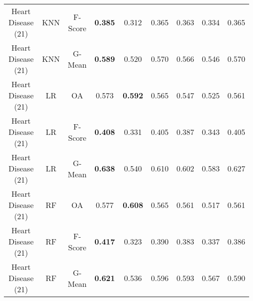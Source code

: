 \begin{longtable}{ccccccccc}
Heart Disease (21) &        KNN & F-Score & \textbf{0.385} &          0.312 &          0.365 &          0.363 &          0.334 &          0.365 \\
Heart Disease (21) &        KNN &  G-Mean & \textbf{0.589} &          0.520 &          0.570 &          0.566 &          0.546 &          0.570 \\
Heart Disease (21) &         LR &      OA &          0.573 & \textbf{0.592} &          0.565 &          0.547 &          0.525 &          0.561 \\
Heart Disease (21) &         LR & F-Score & \textbf{0.408} &          0.331 &          0.405 &          0.387 &          0.343 &          0.405 \\
Heart Disease (21) &         LR &  G-Mean & \textbf{0.638} &          0.540 &          0.610 &          0.602 &          0.583 &          0.627 \\
Heart Disease (21) &         RF &      OA &          0.577 & \textbf{0.608} &          0.565 &          0.561 &          0.517 &          0.561 \\
Heart Disease (21) &         RF & F-Score & \textbf{0.417} &          0.323 &          0.390 &          0.383 &          0.337 &          0.386 \\
Heart Disease (21) &         RF &  G-Mean & \textbf{0.621} &          0.536 &          0.596 &          0.593 &          0.567 &          0.590 \\
\end{longtable}
